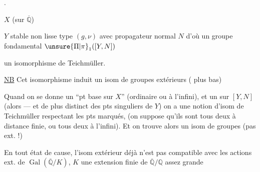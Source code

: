 .

$X$   (sur $\overline{\mathbb Q}$)

$Y$ stable non lisse type $(g,\nu)$ avec propagateur normal $N$ d'où un groupe fondamental  $\unsure{\Pi|\pi}_1([Y,N])$

 un isomorphisme de Teichmüller.

\uline{NB} Cet isomorphisme induit un isom de groupes extérieurs  ( plus bas)

Quand on se donne un ``pt base sur $X$'' (ordinaire ou à l'infini), et un sur $[Y,N]$ (alors --- et de plus distinct des pts singuliers de $Y$) on a une notion d'isom de Teichmüller respectant les pts marqués,  (on suppose qu'ils sont tous deux à distance finie, ou tous deux à l'infini). Et on trouve alors un isom de groupes (pas ext. !)

En tout état de cause,  l'isom extérieur déjà n'est pas compatible avec les actions ext. de $\operatorname{Gal}(\overline{\mathbb Q}/K)$, $K$  une extension finie de $\overline{\mathbb Q}/\mathbb Q$ assez grande

